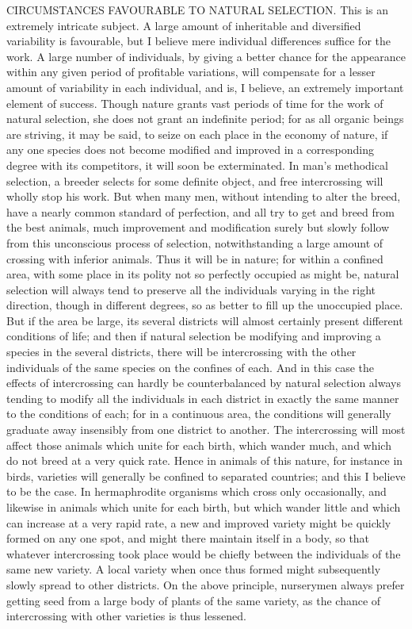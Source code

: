 CIRCUMSTANCES FAVOURABLE TO NATURAL SELECTION.
This is an extremely intricate subject. A large amount of inheritable and diversified variability is favourable, but I believe mere individual differences suffice for the work. A large number of individuals, by giving a better chance for the appearance within any given period of profitable variations, will compensate for a lesser amount of variability in each individual, and is, I believe, an extremely important element of success. Though nature grants vast periods of time for the work of natural selection, she does not grant an indefinite period; for as all organic beings are striving, it may be said, to seize on each place in the economy of nature, if any one species does not become modified and improved in a corresponding degree with its competitors, it will soon be exterminated.
In man's methodical selection, a breeder selects for some definite object, and free intercrossing will wholly stop his work. But when many men, without intending to alter the breed, have a nearly common standard of perfection, and all try to get and breed from the best animals, much improvement and modification surely but slowly follow from this unconscious process of selection, notwithstanding a large amount of crossing with inferior animals. Thus it will be in nature; for within a confined area, with some place in its polity not so perfectly occupied as might be, natural selection will always tend to preserve all the individuals varying in the right direction, though in different degrees, so as better to fill up the unoccupied place. But if the area be large, its several districts will almost certainly present different conditions of life; and then if natural selection be modifying and improving a species in the several districts, there will be intercrossing with the other individuals of the same species on the confines of each. And in this case the effects of intercrossing can hardly be counterbalanced by natural selection always tending to modify all the individuals in each district in exactly the same manner to the conditions of each; for in a continuous area, the conditions will generally graduate away insensibly from one district to another. The intercrossing will most affect those animals which unite for each birth, which wander much, and which do not breed at a very quick rate. Hence in animals of this nature, for instance in birds, varieties will generally be confined to separated countries; and this I believe to be the case. In hermaphrodite organisms which cross only occasionally, and likewise in animals which unite for each birth, but which wander little and which can increase at a very rapid rate, a new and improved variety might be quickly formed on any one spot, and might there maintain itself in a body, so that whatever intercrossing took place would be chiefly between the individuals of the same new variety. A local variety when once thus formed might subsequently slowly spread to other districts. On the above principle, nurserymen always prefer getting seed from a large body of plants of the same variety, as the chance of intercrossing with other varieties is thus lessened.
